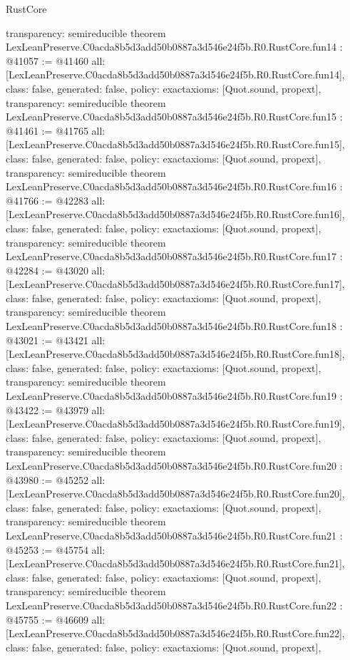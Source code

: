 \begin{lexlean}{RustCore}
\begin{coremodule}
{  transparency: semireducible
}
theorem LexLeanPreserve.C0acda8b5d3add50b0887a3d546e24f5b.R0.RustCore.fun14 : @41057 := @41460 {
  all: [LexLeanPreserve.C0acda8b5d3add50b0887a3d546e24f5b.R0.RustCore.fun14],
  class: false,
  generated: false,
  policy: exact{axioms: [Quot.sound, propext]},
  transparency: semireducible
}
theorem LexLeanPreserve.C0acda8b5d3add50b0887a3d546e24f5b.R0.RustCore.fun15 : @41461 := @41765 {
  all: [LexLeanPreserve.C0acda8b5d3add50b0887a3d546e24f5b.R0.RustCore.fun15],
  class: false,
  generated: false,
  policy: exact{axioms: [Quot.sound, propext]},
  transparency: semireducible
}
theorem LexLeanPreserve.C0acda8b5d3add50b0887a3d546e24f5b.R0.RustCore.fun16 : @41766 := @42283 {
  all: [LexLeanPreserve.C0acda8b5d3add50b0887a3d546e24f5b.R0.RustCore.fun16],
  class: false,
  generated: false,
  policy: exact{axioms: [Quot.sound, propext]},
  transparency: semireducible
}
theorem LexLeanPreserve.C0acda8b5d3add50b0887a3d546e24f5b.R0.RustCore.fun17 : @42284 := @43020 {
  all: [LexLeanPreserve.C0acda8b5d3add50b0887a3d546e24f5b.R0.RustCore.fun17],
  class: false,
  generated: false,
  policy: exact{axioms: [Quot.sound, propext]},
  transparency: semireducible
}
theorem LexLeanPreserve.C0acda8b5d3add50b0887a3d546e24f5b.R0.RustCore.fun18 : @43021 := @43421 {
  all: [LexLeanPreserve.C0acda8b5d3add50b0887a3d546e24f5b.R0.RustCore.fun18],
  class: false,
  generated: false,
  policy: exact{axioms: [Quot.sound, propext]},
  transparency: semireducible
}
theorem LexLeanPreserve.C0acda8b5d3add50b0887a3d546e24f5b.R0.RustCore.fun19 : @43422 := @43979 {
  all: [LexLeanPreserve.C0acda8b5d3add50b0887a3d546e24f5b.R0.RustCore.fun19],
  class: false,
  generated: false,
  policy: exact{axioms: [Quot.sound, propext]},
  transparency: semireducible
}
theorem LexLeanPreserve.C0acda8b5d3add50b0887a3d546e24f5b.R0.RustCore.fun20 : @43980 := @45252 {
  all: [LexLeanPreserve.C0acda8b5d3add50b0887a3d546e24f5b.R0.RustCore.fun20],
  class: false,
  generated: false,
  policy: exact{axioms: [Quot.sound, propext]},
  transparency: semireducible
}
theorem LexLeanPreserve.C0acda8b5d3add50b0887a3d546e24f5b.R0.RustCore.fun21 : @45253 := @45754 {
  all: [LexLeanPreserve.C0acda8b5d3add50b0887a3d546e24f5b.R0.RustCore.fun21],
  class: false,
  generated: false,
  policy: exact{axioms: [Quot.sound, propext]},
  transparency: semireducible
}
theorem LexLeanPreserve.C0acda8b5d3add50b0887a3d546e24f5b.R0.RustCore.fun22 : @45755 := @46609 {
  all: [LexLeanPreserve.C0acda8b5d3add50b0887a3d546e24f5b.R0.RustCore.fun22],
  class: false,
  generated: false,
  policy: exact{axioms: [Quot.sound, propext]},
}
\end{coremodule}
\end{lexlean}
